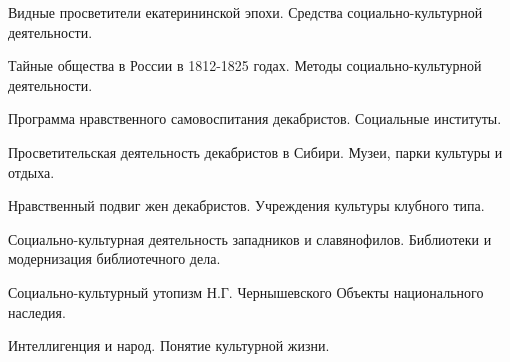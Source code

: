 \documentclass[
	14pt,
	a4paper,
	]
	{scrartcl}
\begin{document}
\vfill
\z Видные просветители екатерининской эпохи.
 \vfill
\z Средства социально-культурной деятельности.
 \vfill

\vfill

\newpage


\shapk
{}
\setcounter{zad}{0}

\vfill
\z Тайные общества в России в 1812-1825 годах.
 \vfill
\z Методы социально-культурной деятельности.
 \vfill

\vfill

\newpage


\shapk
{}
\setcounter{zad}{0}

\vfill
\z Программа нравственного самовоспитания декабристов.
 \vfill
\z Социальные институты.
 \vfill

\vfill

\newpage


\shapk
{}
\setcounter{zad}{0}

\vfill
\z Просветительская деятельность декабристов в Сибири.
 \vfill
\z Музеи, парки культуры и отдыха.
 \vfill

\vfill

\newpage


\shapk
{}
\setcounter{zad}{0}

\vfill
\z Нравственный подвиг жен декабристов.
 \vfill
\z Учреждения культуры клубного типа.
 \vfill

\vfill

\newpage


\shapk
{}
\setcounter{zad}{0}

\vfill
\z Социально-культурная деятельность западников и славянофилов.
 \vfill
\z Библиотеки и модернизация библиотечного дела.
 \vfill

\vfill

\newpage


\shapk
{}
\setcounter{zad}{0}

\vfill
\z Социально-культурный утопизм Н.Г. Чернышевского
 \vfill
\z Объекты национального наследия.
 \vfill

\vfill

\newpage


\shapk
{}
\setcounter{zad}{0}

\vfill
\z Интеллигенция и народ.
 \vfill
\z Понятие культурной жизни.
 \vfill

\vfill
\end{document}
